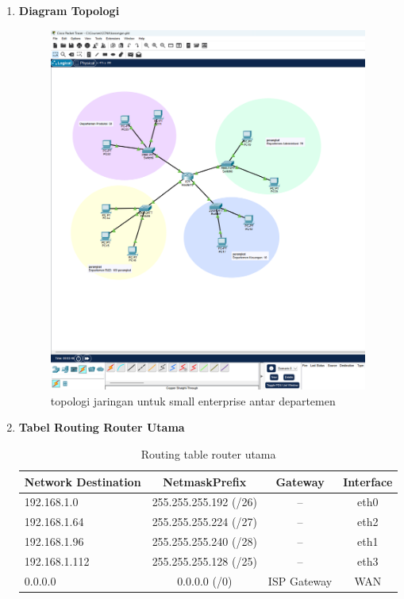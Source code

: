 \begin{enumerate}
    \item \textbf{Diagram Topologi}\newline
        \begin{figure}[H]
          \centering
          \includegraphics[width=\linewidth,height=12cm,keepaspectratio]{P1/img/Topologi.png}
          \caption{topologi jaringan untuk small enterprise antar departemen}
          \label{fig:topologi}
        \end{figure}
    
	\item \textbf{Tabel Routing Router Utama}\newline
        \begin{table}[H]
        \centering
        \begin{tabular}{|l|c|c|c|}
          \hline
          Network Destination & Netmask\/Prefix & Gateway & Interface \\
          \hline
          192.168.1.0 & 255.255.255.192 (/26) & -- & eth0 \\
          192.168.1.64 & 255.255.255.224 (/27) & -- & eth2 \\
          192.168.1.96 & 255.255.255.240 (/28) & -- & eth1 \\
          192.168.1.112 & 255.255.255.128 (/25) & -- & eth3 \\
          0.0.0.0 & 0.0.0.0 (/0) & ISP Gateway & WAN \\
          \hline
        \end{tabular}
        \caption{Routing table router utama}
        \end{table}
        

\end{enumerate}
